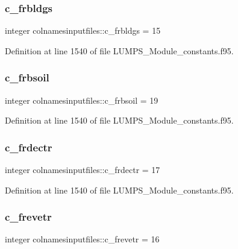 \subsubsection{\texorpdfstring{c\+\_\+frbldgs}{c\_frbldgs}}
{\footnotesize\ttfamily integer colnamesinputfiles\+::c\+\_\+frbldgs = 15}



Definition at line 1540 of file L\+U\+M\+P\+S\+\_\+\+Module\+\_\+constants.\+f95.

\mbox{\label{namespacecolnamesinputfiles_abc5659ccd0e939172ca714548673744e}} 
\subsubsection{\texorpdfstring{c\+\_\+frbsoil}{c\_frbsoil}}
{\footnotesize\ttfamily integer colnamesinputfiles\+::c\+\_\+frbsoil = 19}



Definition at line 1540 of file L\+U\+M\+P\+S\+\_\+\+Module\+\_\+constants.\+f95.

\mbox{\label{namespacecolnamesinputfiles_a1ebacc2fbd10cdf035cf02a06f33c944}} 
\subsubsection{\texorpdfstring{c\+\_\+frdectr}{c\_frdectr}}
{\footnotesize\ttfamily integer colnamesinputfiles\+::c\+\_\+frdectr = 17}



Definition at line 1540 of file L\+U\+M\+P\+S\+\_\+\+Module\+\_\+constants.\+f95.

\mbox{\label{namespacecolnamesinputfiles_a565e5f16a20642fda72028b34cb88bb3}} 
\subsubsection{\texorpdfstring{c\+\_\+frevetr}{c\_frevetr}}
{\footnotesize\ttfamily integer colnamesinputfiles\+::c\+\_\+frevetr = 16}



